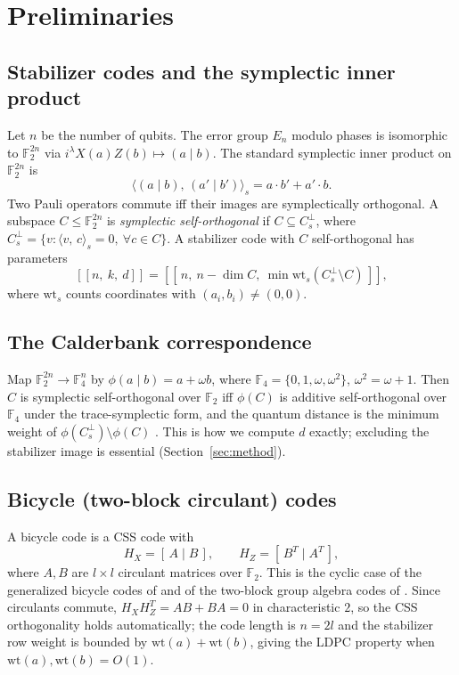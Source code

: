 \documentclass[journal,onecolumn]{IEEEtran}
\theoremstyle{definition}
\theoremstyle{remark}
\newcommand{\F}{\mathbb{F}}
\newcommand{\wt}{\mathrm{wt}}
\newcommand{\sinner}[2]{\langle #1,\,#2\rangle_{s}}
\begin{document}
\section{Preliminaries}\label{sec:prelim}
\subsection{Stabilizer codes and the symplectic inner product}
Let $n$ be the number of qubits. The error group $E_n$ modulo phases is
isomorphic to $\F_2^{2n}$ via $i^{\lambda}X(a)Z(b)\mapsto(a\mid b)$. The
standard symplectic inner product on $\F_2^{2n}$ is
\[
\sinner{(a\mid b)}{(a'\mid b')} = a\cdot b' + a'\cdot b .
\]
Two Pauli operators commute iff their images are symplectically orthogonal.
A subspace $C\le\F_2^{2n}$ is \emph{symplectic self-orthogonal} if
$C\subseteq C_s^{\perp}$, where
$C_s^{\perp}=\{v:\sinner{v}{c}=0,\ \forall c\in C\}$. A stabilizer code with
$C$ self-orthogonal has parameters
\[
[[n,\ k,\ d]]=[[\,n,\ n-\dim C,\ \min\wt_{s}(C_s^{\perp}\setminus C)\,]],
\]
where $\wt_s$ counts coordinates with $(a_i,b_i)\ne(0,0)$.

\subsection{The Calderbank correspondence}
Map $\F_2^{2n}\to\F_4^{n}$ by $\phi(a\mid b)=a+\omega b$, where
$\F_4=\{0,1,\omega,\omega^2\}$, $\omega^2=\omega+1$. Then $C$ is symplectic
self-orthogonal over $\F_2$ iff $\phi(C)$ is additive self-orthogonal over
$\F_4$ under the trace-symplectic form, and the quantum distance is the
minimum weight of $\phi(C_s^{\perp})\setminus\phi(C)$
\cite{CRSS98}. This is how we compute $d$ exactly; excluding the stabilizer
image is essential (Section~\ref{sec:method}).

\subsection{Bicycle (two-block circulant) codes}
A bicycle code is a CSS code with
\[
H_X=[\,A\mid B\,],\qquad H_Z=[\,B^{T}\mid A^{T}\,],
\]
where $A,B$ are $l\times l$ circulant matrices over $\F_2$. This is the
cyclic case of the generalized bicycle codes of \cite{KP13a} and of the
two-block group algebra codes of \cite{2BGA}. Since circulants commute,
$H_XH_Z^{T}=AB+BA=0$ in characteristic $2$, so the CSS orthogonality holds
automatically; the code length is $n=2l$ and the stabilizer row weight is
bounded by $\wt(a)+\wt(b)$, giving the LDPC property when
$\wt(a),\wt(b)=O(1)$.
\end{document}
